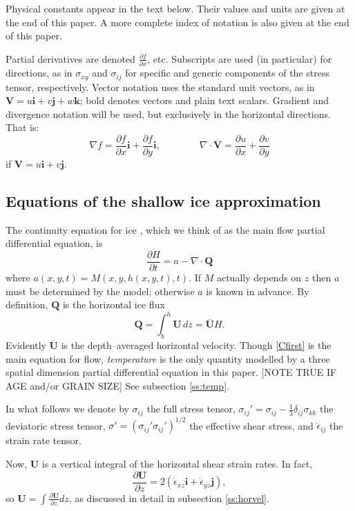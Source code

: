 \documentclass[12pt,final]{amsart}%
\theoremstyle{plain}
\theoremstyle{definition}
\theoremstyle{remark}
\newcommand{\ddt}[1]{\ensuremath{\frac{\partial #1}{\partial t}}}
\newcommand{\ddx}[1]{\ensuremath{\frac{\partial #1}{\partial x}}}
\newcommand{\ddy}[1]{\ensuremath{\frac{\partial #1}{\partial y}}}
\newcommand{\ddz}[1]{\ensuremath{\frac{\partial #1}{\partial z}}}
\newcommand{\diverg}{\nabla\cdot}
\def\eps{\epsilon}
\newcommand{\grad}{\nabla}
\newcommand{\ihat}{\mathbf{i}}
\newcommand{\jhat}{\mathbf{j}}
\newcommand{\khat}{\mathbf{k}}
\newcommand{\bQ}{{\mathbf{Q}}}
\newcommand{\bU}{{\mathbf{U}}}
\newcommand{\bV}{{\mathbf{V}}}
\begin{document}
Physical constants appear in the text below.  Their values and units are given at the end of this paper.  A more complete index of notation is also given at the end of this paper.

Partial derivatives are denoted $\frac{\partial f}{\partial x}$, etc.  Subscripts are used (in particular) for directions, as in $\sigma_{xy}$ and $\sigma_{ij}$ for specific and generic components of the stress tensor, respectively.  Vector notation uses the standard unit vectors, as in $\bV=u\ihat+v\jhat+w\khat$; bold denotes vectors and plain text scalars.  Gradient and divergence notation will be used, but exclusively in the horizontal directions.  That is:
    $$\grad f = \ddx{f} \ihat + \ddy{f} \ihat, \qquad \qquad \diverg \bV = \ddx{u} + \ddy{v}$$
if $\bV=u\ihat+v\jhat$.


\subsection*{Equations of the shallow ice approximation}  The continuity equation for ice \citep{Paterson}, which we think of as the main flow partial differential equation, is
\begin{equation}\label{Cfirst}
\ddt{H} = a - \diverg \bQ
\end{equation}
where $a(x,y,t)=M(x,y,h(x,y,t),t)$.  If $M$ actually depends on $z$ then $a$ must be determined by the model; otherwise $a$ is known in advance.  By definition, $\bQ$ is the horizontal ice flux
\begin{equation}\label{flux}
\bQ = \int_{b}^h \bU\,dz = \bar \bU H.
\end{equation}
Evidently $\bar \bU$ is the depth--averaged horizontal velocity.  Though \eqref{Cfirst} is the main equation for flow, \emph{temperature} is the only quantity modelled by a three spatial dimension partial differential equation in this paper.  [NOTE TRUE IF AGE and/or GRAIN SIZE]  See subsection \ref{ss:temp}.

In what follows we denote by $\sigma_{ij}$ the full stress tensor, $\sigma_{ij}'= \sigma_{ij}- \frac{1}{3} \delta_{ij} \sigma_{kk}$ the deviatoric stress tensor, $\sigma'= \left(\sigma_{ij}' \sigma_{ij}'\right)^{1/2}$  the effective shear stress, and $\dot \eps_{ij}$ the strain rate tensor.

Now, $\bU$ is a vertical integral of the horizontal shear strain rates.  In fact,
\begin{equation}\label{stressstrain}
\ddz{\bU} = 2(\dot\eps_{xz}\ihat+\dot\eps_{yz}\jhat),
\end{equation}
so $\bU=\int \ddz{\bU} dz$, as discussed in detail in subsection \ref{ss:horvel}.
\end{document}
